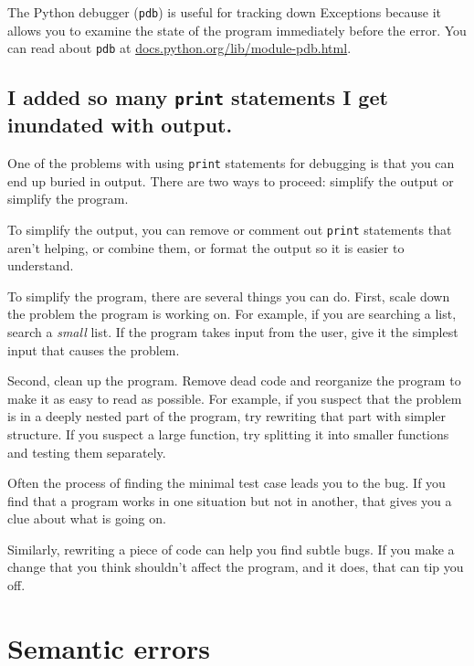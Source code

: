 \documentclass[10pt]{book}
\begin{document}
\begin{CJK}{UTF8}{gbsn}
\begin{description}
\end{description}

The Python debugger ({\tt pdb}) is useful for tracking down
Exceptions because it allows you to examine the state of the
program immediately before the error.  You can read
about {\tt pdb} at \url{docs.python.org/lib/module-pdb.html}.


\subsection{I added so many {\tt print} statements I get inundated with
output.}

One of the problems with using {\tt print} statements for debugging
is that you can end up buried in output.  There are two ways
to proceed: simplify the output or simplify the program.

To simplify the output, you can remove or comment out {\tt print}
statements that aren't helping, or combine them, or format
the output so it is easier to understand.

To simplify the program, there are several things you can do.  First,
scale down the problem the program is working on.  For example, if you
are searching a list, search a {\em small} list.  If the program takes
input from the user, give it the simplest input that causes the
problem.

Second, clean up the program.  Remove dead code and reorganize the
program to make it as easy to read as possible.  For example, if you
suspect that the problem is in a deeply nested part of the program,
try rewriting that part with simpler structure.  If you suspect a
large function, try splitting it into smaller functions and testing them
separately.

Often the process of finding the minimal test case leads you to the
bug.  If you find that a program works in one situation but not in
another, that gives you a clue about what is going on.

Similarly, rewriting a piece of code can help you find subtle
bugs.  If you make a change that you think shouldn't affect the
program, and it does, that can tip you off.


\section{Semantic errors}


\end{CJK}
\end{document}

